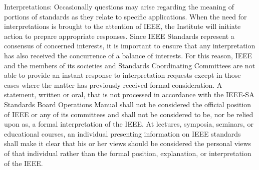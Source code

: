 \begin{minipage}[t]{396pt}
                             \vspace{5.3pt}
                             Interpretations: Occasionally questions may arise regarding the meaning of portions of standards as they relate to\linebreak
                             specific applications. When the need for interpretations is brought to the attention of IEEE, the Institute will initiate\linebreak
                             action to prepare appropriate responses. Since IEEE Standards represent a consensus of concerned interests, it is\linebreak
                             important to ensure that any interpretation has also received the concurrence of a balance of interests. For this reason,\linebreak
                             IEEE and the members of its societies and Standards Coordinating Committees are not able to provide an instant\linebreak
                             response to interpretation requests except in those cases where the matter has previously received formal\linebreak
                             consideration. A statement, written or oral, that is not processed in accordance with the IEEE-SA Standards Board\linebreak
                             Operations Manual shall not be considered the official position of IEEE or any of its committees and shall not be\linebreak
                             considered to be, nor be relied upon as, a formal interpretation of the IEEE. At lectures, symposia, seminars, or\linebreak
                             educational courses, an individual presenting information on IEEE standards shall make it clear that his or her views\linebreak
                             should be considered the personal views of that individual rather than the formal position, explanation, or\linebreak
                             interpretation of the IEEE.\par


\end{minipage}
